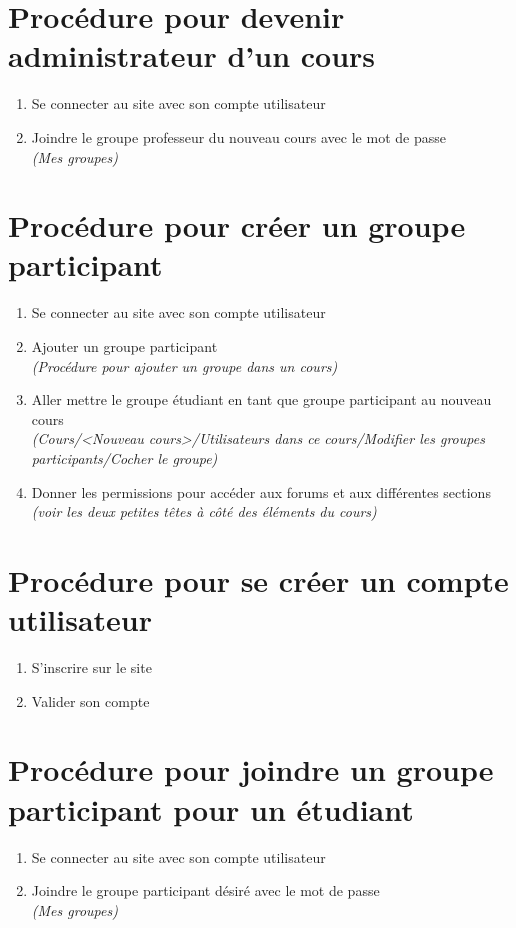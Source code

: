 \documentclass[letterpaper]{article}
\begin{document}
\section{Procédure pour devenir administrateur d'un cours}
\begin{enumerate}

\item Se connecter au site avec son compte utilisateur
\item Joindre le groupe professeur du nouveau cours avec le mot de passe
    \\ \emph{(Mes groupes)}
\end{enumerate}

\section{Procédure pour créer un groupe participant}
\begin{enumerate}

\item Se connecter au site avec son compte utilisateur
\item Ajouter un groupe participant
    \\ \emph{(Procédure pour ajouter un groupe dans un cours)}
\item Aller mettre le groupe étudiant en tant que groupe participant au nouveau cours
    \\ \emph{(Cours/<Nouveau cours>/Utilisateurs dans ce cours/Modifier les groupes participants/Cocher le groupe)}
\item Donner les permissions pour accéder aux forums et aux différentes sections
    \\ \emph{(voir les deux petites têtes à côté des éléments du cours)}
\end{enumerate}

\section{Procédure pour se créer un compte utilisateur}
\begin{enumerate}

\item S'inscrire sur le site
\item Valider son compte
\end{enumerate}


\section{Procédure pour joindre un groupe participant pour un étudiant}
\begin{enumerate}

\item Se connecter au site avec son compte utilisateur
\item Joindre le groupe participant désiré avec le mot de passe
    \\ \emph{(Mes groupes)}
\end{enumerate}
\end{document}
